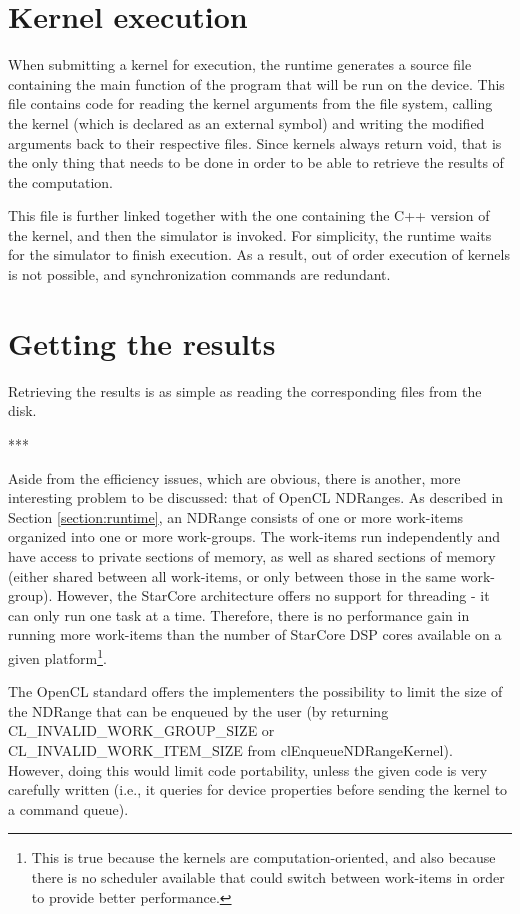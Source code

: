 \section{Kernel execution}
When submitting a kernel for execution, the runtime generates a source file containing the main function of the program that will be run on the device. This file contains code for reading the kernel arguments from the file system, calling the kernel (which is declared as an external symbol) and writing the modified arguments back to their respective files. Since kernels always return void, that is the only thing that needs to be done in order to be able to retrieve the results of the computation.

This file is further linked together with the one containing the C++ version of the kernel, and then the simulator is invoked. For simplicity, the runtime waits for the simulator to finish execution. As a result, out of order execution of kernels is not possible, and synchronization commands are redundant.

\section{Getting the results}
Retrieving the results is as simple as reading the corresponding files from the disk.

\vspace*{2\baselineskip}
***

\vspace*{1\baselineskip}
Aside from the efficiency issues, which are obvious, there is another, more interesting problem to be discussed: that of OpenCL NDRanges. As described in Section \ref{section:runtime}, an NDRange consists of one or more work-items organized into one or more work-groups. The work-items run independently and have access to private sections of memory, as well as shared sections of memory (either shared between all work-items, or only between those in the same work-group). However, the StarCore architecture offers no support for threading - it can only run one task at a time. Therefore, there is no performance gain in running more work-items than the number of StarCore DSP cores available on a given platform\footnote{This is true because the kernels are computation-oriented, and also because there is no scheduler available that could switch between work-items in order to provide better performance.}.

The OpenCL standard offers the implementers the possibility to limit the size of the NDRange that can be enqueued by the user (by returning CL\_INVALID\_WORK\_GROUP\_SIZE or CL\_INVALID\_WORK\_ITEM\_SIZE from clEnqueueNDRangeKernel). However, doing this would limit code portability, unless the given code is very carefully written (i.e., it queries for device properties before sending the kernel to a command queue). 

